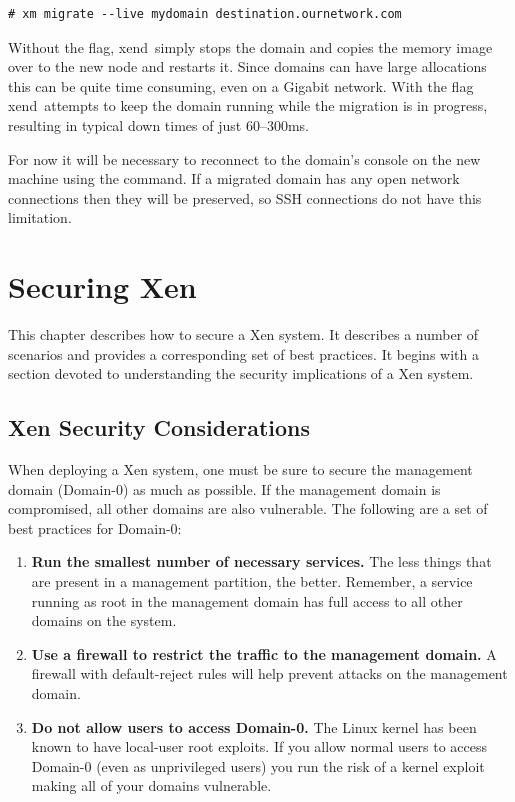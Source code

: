 \documentclass[11pt,twoside,final,openright]{report}
\def\xend{{xend}\xspace}
\begin{document}
\begin{verbatim}
# xm migrate --live mydomain destination.ournetwork.com
\end{verbatim}

Without the  flag, \xend\ simply stops the domain and
copies the memory image over to the new node and restarts it. Since
domains can have large allocations this can be quite time consuming,
even on a Gigabit network. With the  flag \xend\ attempts
to keep the domain running while the migration is in progress, resulting
in typical down times of just 60--300ms.

For now it will be necessary to reconnect to the domain's console on the
new machine using the  command. If a migrated domain
has any open network connections then they will be preserved, so SSH
connections do not have this limitation.


\chapter{Securing Xen}

This chapter describes how to secure a Xen system. It describes a number
of scenarios and provides a corresponding set of best practices. It
begins with a section devoted to understanding the security implications
of a Xen system.


\section{Xen Security Considerations}

When deploying a Xen system, one must be sure to secure the management
domain (Domain-0) as much as possible. If the management domain is
compromised, all other domains are also vulnerable. The following are a
set of best practices for Domain-0:

\begin{enumerate}
\item \textbf{Run the smallest number of necessary services.} The less
  things that are present in a management partition, the better.
  Remember, a service running as root in the management domain has full
  access to all other domains on the system.
\item \textbf{Use a firewall to restrict the traffic to the management
    domain.} A firewall with default-reject rules will help prevent
  attacks on the management domain.
\item \textbf{Do not allow users to access Domain-0.} The Linux kernel
  has been known to have local-user root exploits. If you allow normal
  users to access Domain-0 (even as unprivileged users) you run the risk
  of a kernel exploit making all of your domains vulnerable.
\end{enumerate}
\end{document}
